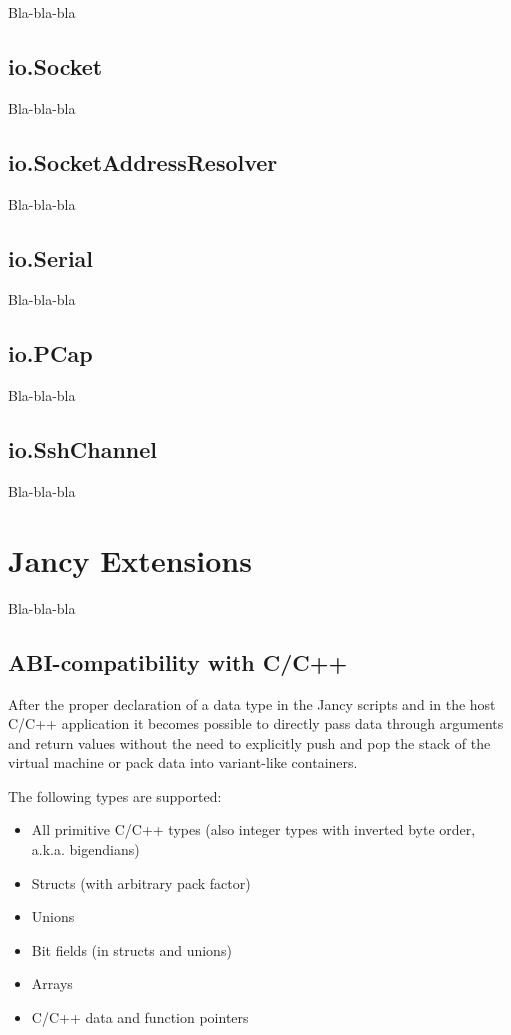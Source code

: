\documentclass[oneside]{book}
\begin{document}
Bla-bla-bla

\section{io.Socket}

Bla-bla-bla

\section{io.SocketAddressResolver}

Bla-bla-bla

\section{io.Serial}

Bla-bla-bla

\section{io.PCap}

Bla-bla-bla

\section{io.SshChannel}

Bla-bla-bla

\chapter{Jancy Extensions}

Bla-bla-bla

\section{ABI-compatibility with C/C++}

After the proper declaration of a data type in the Jancy scripts and in the host C/C++ application it becomes possible to directly pass data through arguments and return values without the need to explicitly push and pop the stack of the virtual machine or pack data into variant-like containers.

The following types are supported:

\begin{itemize}
\item All primitive C/C++ types (also integer types with inverted byte order, a.k.a. bigendians)
\item Structs (with arbitrary pack factor)
\item Unions
\item Bit fields (in structs and unions)
\item Arrays
\item C/C++ data and function pointers
\end{itemize}
\end{document}
